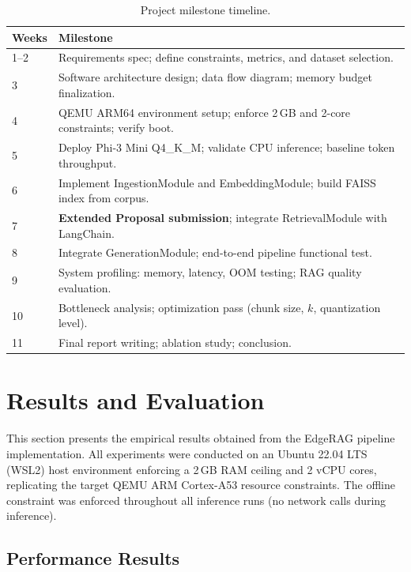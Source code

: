 \documentclass[10pt,twocolumn]{article}
\begin{document}
\begin{table}[H]
\centering
\caption{Project milestone timeline.}
\label{tab:timeline}
\small
\begin{tabularx}{\linewidth}{@{}lX@{}}
\toprule
\textbf{Weeks} & \textbf{Milestone} \\
\midrule
1--2  & Requirements spec; define constraints, metrics, and dataset selection. \\
3     & Software architecture design; data flow diagram; memory budget finalization. \\
4     & QEMU ARM64 environment setup; enforce 2\,GB and 2-core constraints; verify boot. \\
5     & Deploy Phi-3 Mini Q4\_K\_M; validate CPU inference; baseline token throughput. \\
6     & Implement IngestionModule and EmbeddingModule; build FAISS index from corpus. \\
7     & \textbf{Extended Proposal submission}; integrate RetrievalModule with LangChain. \\
8     & Integrate GenerationModule; end-to-end pipeline functional test. \\
9     & System profiling: memory, latency, OOM testing; RAG quality evaluation. \\
10    & Bottleneck analysis; optimization pass (chunk size, $k$, quantization level). \\
11    & Final report writing; ablation study; conclusion. \\
\bottomrule
\end{tabularx}
\end{table}

\section{Results and Evaluation}
\label{sec:results}

This section presents the empirical results obtained from the EdgeRAG pipeline
implementation. All experiments were conducted on an Ubuntu 22.04 LTS (WSL2)
host environment enforcing a 2\,GB RAM ceiling and 2 vCPU cores, replicating
the target QEMU ARM Cortex-A53 resource constraints. The offline constraint
was enforced throughout all inference runs (no network calls during inference).

\subsection{Performance Results}
\end{document}
